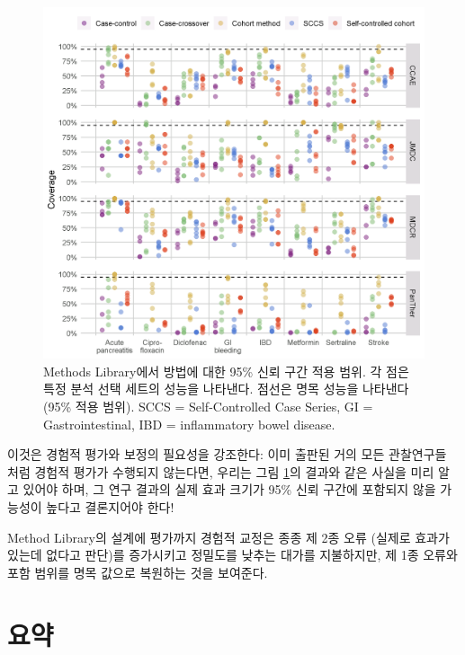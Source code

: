 \documentclass[10.5pt]{book}
\theoremstyle{definition}
\theoremstyle{definition}
\theoremstyle{definition}
\theoremstyle{remark}
\begin{document}
\begin{figure}[h]

{\centering \includegraphics[width=1\linewidth]{images/MethodValidity/methodEval} 

}

\caption{Methods Library에서 방법에 대한 95\% 신뢰 구간 적용 범위. 각 점은 특정 분석 선택 세트의 성능을 나타낸다. 점선은 명목 성능을 나타낸다 (95\% 적용 범위). SCCS = Self-Controlled Case Series, GI = Gastrointestinal, IBD = inflammatory bowel disease.}\label{fig:methodEval}
\end{figure}

이것은 경험적 평가와 보정의 필요성을 강조한다: 이미 출판된 거의 모든
관찰연구들 처럼 경험적 평가가 수행되지 않는다면, 우리는 그림
\ref{fig:methodEval}의 결과와 같은 사실을 미리 알고 있어야 하며, 그 연구
결과의 실제 효과 크기가 95\% 신뢰 구간에 포함되지 않을 가능성이 높다고
결론지어야 한다!

Method Library의 설계에 평가까지 경험적 교정은 종종 제 2종 오류 (실제로
효과가 있는데 없다고 판단)를 증가시키고 정밀도를 낮추는 대가를
지불하지만, 제 1종 오류와 포함 범위를 명목 값으로 복원하는 것을
보여준다.

\section{요약}\label{-16}
\end{document}
